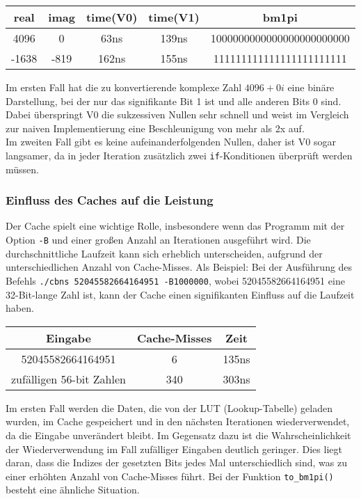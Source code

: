 \documentclass[course=erap]{aspdoc}
\begin{document}
    \begin{center}
    \begin{tabular}{||c|c|c|c|c||}
    \hline
    real & imag & time(V0) & time(V1) & bm1pi\\
    \hline
    4096 & 0  & 63ns & 139ns & 1000000000000000000000000\\
    \hline
    -1638 & -819  & 162ns  & 155ns & 111111111111111111111111\\
    \hline
    \end{tabular}
\end{center}
Im ersten Fall hat die zu konvertierende komplexe Zahl $4096 + 0i$ eine binäre Darstellung, bei der nur das signifikante Bit 1 ist und alle anderen Bits 0 sind. Dabei überspringt V0 die sukzessiven Nullen sehr schnell und weist im Vergleich zur naiven Implementierung eine Beschleunigung von mehr als 2x auf.\\
Im zweiten Fall gibt es keine aufeinanderfolgenden Nullen, daher ist V0 sogar langsamer, da in jeder Iteration zusätzlich zwei \texttt{if}-Konditionen überprüft werden müssen.
\subsubsection{Einfluss des Caches auf die Leistung}
Der Cache spielt eine wichtige Rolle, insbesondere wenn das Programm mit der Option \texttt{-B} und einer großen Anzahl an Iterationen ausgeführt wird. Die durchschnittliche Laufzeit kann sich erheblich unterscheiden, aufgrund der unterschiedlichen Anzahl von Cache-Misses.
Als Beispiel: Bei der Ausführung des Befehls \texttt{./cbns 52045582664164951 -B1000000}, wobei 52045582664164951 eine 32-Bit-lange Zahl ist, kann der Cache einen signifikanten Einfluss auf die Laufzeit haben.
    \begin{center}
    \begin{tabular}{||c|c|c||}
    \hline
    Eingabe & Cache-Misses & Zeit\\
    \hline
    52045582664164951 & 6   & 135ns\\
    \hline
    zuf{\"a}lligen 56-bit Zahlen & 340  & 303ns\\
    \hline
    \end{tabular}
\end{center}
Im ersten Fall werden die Daten, die von der LUT (Lookup-Tabelle) geladen wurden, im Cache gespeichert und in den nächsten Iterationen wiederverwendet, da die Eingabe unverändert bleibt. Im Gegensatz dazu ist die Wahrscheinlichkeit der Wiederverwendung im Fall zufälliger Eingaben deutlich geringer. Dies liegt daran, dass die Indizes der gesetzten Bits jedes Mal unterschiedlich sind, was zu einer erhöhten Anzahl von Cache-Misses führt. Bei der Funktion \texttt{to\_bm1pi()} besteht eine ähnliche Situation.
\end{document}
